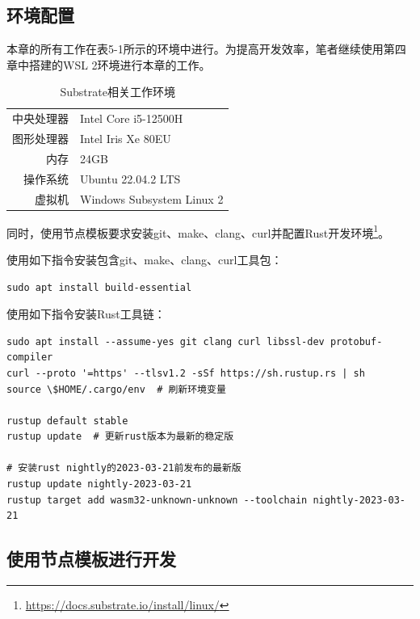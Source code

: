 \subsection{环境配置}

本章的所有工作在表5-1所示的环境中进行。为提高开发效率，笔者继续使用第四章中搭建的WSL 2环境进行本章的工作。

\begin{table}[htbp]
    \linespread{1.5}
    \centering
    \caption{Substrate相关工作环境}\label{Substrate相关工作环境}
    \begin{tabular}{r|l} \toprule
        中央处理器 & Intel Core i5-12500H      \\
        图形处理器 & Intel Iris Xe 80EU        \\
        内存    & 24GB                      \\
        操作系统  & Ubuntu 22.04.2 LTS        \\
        虚拟机   & Windows Subsystem Linux 2 \\
        \bottomrule
    \end{tabular}
\end{table}

同时，使用节点模板要求安装git、make、clang、curl并配置Rust开发环境\footnote{\url{https://docs.substrate.io/install/linux/}}。

使用如下指令安装包含git、make、clang、curl工具包：

\begin{lstlisting}[caption={安装工具包}, label={lst:安装工具包}]
sudo apt install build-essential
\end{lstlisting}

使用如下指令安装Rust工具链：

\begin{lstlisting}[caption={安装Rust工具链}, label={lst:安装Rust工具链}]
sudo apt install --assume-yes git clang curl libssl-dev protobuf-compiler
curl --proto '=https' --tlsv1.2 -sSf https://sh.rustup.rs | sh
source \$HOME/.cargo/env  # 刷新环境变量

rustup default stable
rustup update  # 更新rust版本为最新的稳定版

# 安装rust nightly的2023-03-21前发布的最新版
rustup update nightly-2023-03-21
rustup target add wasm32-unknown-unknown --toolchain nightly-2023-03-21
\end{lstlisting}

\subsection{使用节点模板进行开发}

